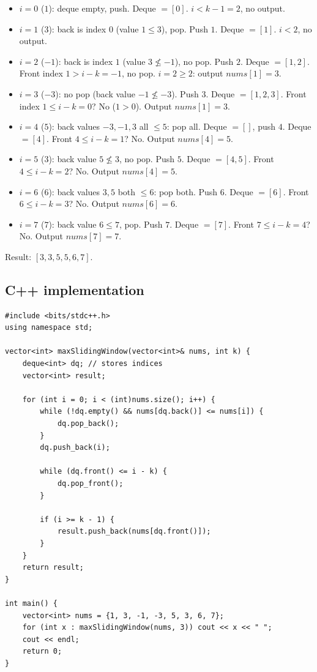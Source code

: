 \begin{itemize}
  \item $i=0$ ($1$): deque empty, push. Deque $=[0]$. $i<k-1=2$, no
        output.
  \item $i=1$ ($3$): back is index $0$ (value $1\le3$), pop. Push $1$.
        Deque $=[1]$. $i<2$, no output.
  \item $i=2$ ($-1$): back is index $1$ (value $3 \not\le -1$), no pop.
        Push $2$. Deque $=[1,2]$. Front index $1 > i-k=-1$, no pop.
        $i=2\ge2$: output $\textit{nums}[1]=3$.
  \item $i=3$ ($-3$): no pop (back value $-1\not\le-3$). Push $3$.
        Deque $=[1,2,3]$. Front index $1 \le i-k=0$? No ($1>0$). Output
        $\textit{nums}[1]=3$.
  \item $i=4$ ($5$): back values $-3,-1,3$ all $\le5$: pop all. Deque
        $=[]$, push $4$. Deque $=[4]$. Front $4 \le i-k=1$? No. Output
        $\textit{nums}[4]=5$.
  \item $i=5$ ($3$): back value $5\not\le3$, no pop. Push $5$. Deque
        $=[4,5]$. Front $4\le i-k=2$? No. Output $\textit{nums}[4]=5$.
  \item $i=6$ ($6$): back values $3,5$ both $\le6$: pop both. Push $6$.
        Deque $=[6]$. Front $6\le i-k=3$? No. Output
        $\textit{nums}[6]=6$.
  \item $i=7$ ($7$): back value $6\le7$, pop. Push $7$. Deque $=[7]$.
        Front $7\le i-k=4$? No. Output $\textit{nums}[7]=7$.
\end{itemize}

Result: $[3,3,5,5,6,7]$.

\subsection*{C++ implementation}

\begin{lstlisting}
#include <bits/stdc++.h>
using namespace std;

vector<int> maxSlidingWindow(vector<int>& nums, int k) {
    deque<int> dq; // stores indices
    vector<int> result;

    for (int i = 0; i < (int)nums.size(); i++) {
        while (!dq.empty() && nums[dq.back()] <= nums[i]) {
            dq.pop_back();
        }
        dq.push_back(i);

        while (dq.front() <= i - k) {
            dq.pop_front();
        }

        if (i >= k - 1) {
            result.push_back(nums[dq.front()]);
        }
    }
    return result;
}

int main() {
    vector<int> nums = {1, 3, -1, -3, 5, 3, 6, 7};
    for (int x : maxSlidingWindow(nums, 3)) cout << x << " ";
    cout << endl;
    return 0;
}
\end{lstlisting}

